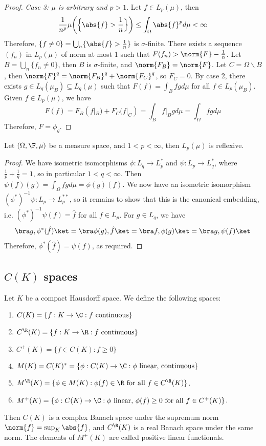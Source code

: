 \documentclass[a4paper]{article}
\begin{document}
\begin{proof}
	\emph{Case 3: $\mu$ is arbitrary and $p>1$}. Let $f\in L_p(\mu)$, then
	\[
	 \frac{1}{n^p}\mu\bigg(\Big\{\abs{f}>\frac{1}{n}\Big\}\bigg)\leq\int_\Omega\abs{f}^p d\mu<\infty
	\]
	Therefore, $\{f\not= 0\}=\bigcup_n\{\abs{f}>\frac{1}{n}\}$ is $\sigma$-finite. There exists a sequence $(f_n)$ in $L_p(\mu)$ of norm at most 1 such that $F(f_n)>\norm{F}-\frac{1}{n}$. Let $B=\bigcup_n\{f_n\not= 0\}$, then $B$ is $\sigma$-finite, and $\norm{F_B}=\norm{F}$. Let $C=\Omega\backslash B$, then $\norm{F}^q=\norm{F_B}^q+\norm{F_C}^q$, so $F_C=0$. By case 2, there exists $g\in L_q(\mu_B)\subseteq L_q(\mu)$ such that $F(f)=\int_B fg d\mu$ for all $f\in L_p(\mu_B)$. Given $f\in L_p(\mu)$, we have
	\[
	 F(f)=F_B(f|_B)+F_C(f|_C)=\int_B f|_B gd\mu=\int_\Omega fg d\mu
	\]
	Therefore, $F=\phi_g$.
\end{proof}

\begin{ncor}\label{cor:LpReflexive}
  Let $(\Omega,\F,\mu)$ be a measure space, and $1<p<\infty$, then $L_p(\mu)$ is reflexive.
\end{ncor}

\begin{proof}
  We have isometric isomorphisms $\phi:L_q\to L_p^*$ and $\psi:L_p\to L_q^*$, where $\frac{1}{p}+\frac{1}{q}=1$, so in particular $1<q<\infty$. Then $\psi(f)(g)=\int_\Omega fg d\mu=\phi(g)(f)$. We now have an isometric isomorphism $(\phi^*)^{-1}\psi:L_p\to L_p^{**}$, so it remains to show that this is the canonical embedding, i.e. $(\phi^*)^{-1}\psi(f)=\hat{f}$ for all $f\in L_p$. For $g\in L_q$, we have
  \[
    \bra g,\phi^*(\hat{f})\ket=\bra\phi(g),\hat{f}\ket=\bra f,\phi(g)\ket=\bra g,\psi(f)\ket
  \]
  Therefore, $\phi^*(\hat{f})=\psi(f)$, as required.
\end{proof}

\subsection*{$C(K)$ spaces}
Let $K$ be a compact Hausdorff space. We define the following spaces:
\begin{enumerate}[label=-, nosep]
	\item $C(K)=\{f:K\to\C:f\text{ continuous}\}$
	\item $C^\R(K)=\{f:K\to\R:f\text{ continuous}\}$
	\item $C^+(K)=\{f\in C(K):f\geq 0\}$
	\item $M(K)=C(K)^*=\{\phi:C(K)\to\C:\phi\text{ linear, continuous}\}$
	\item $M^\R(K)=\{\phi\in M(K):\phi(f)\in\R\text{ for all }f\in C^\R(K)\}$.
	\item $M^+(K)=\{\phi:C(K)\to\C:\phi\text{ linear, }\phi(f)\geq 0\text{ for all }f\in C^+(K)\}$.
\end{enumerate}
Then $C(K)$ is a complex Banach space under the supremum norm $\norm{f}=\sup_K\abs{f}$, and $C^\R(K)$ is a real Banach space under the same norm. The elements of $M^+(K)$ are called positive linear functionals.
\end{document}
